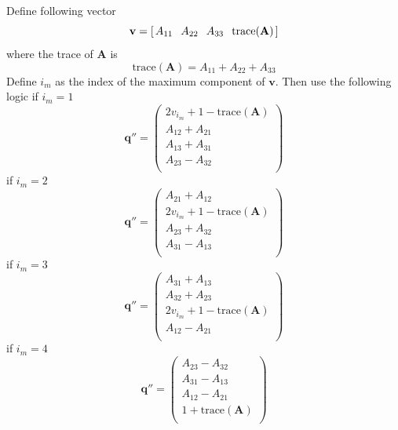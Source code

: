 Define following vector
%
\begin{equation}
   \mathbf{v} = [ \hspace{.02 in} A_{11} \hspace{.1 in} A_{22}\hspace{.1 in}
   A_{33} \hspace{.1 in}  \mbox{trace}(\mathbf{A}) \hspace{.02 in}]
\end{equation}
%
where the trace of $\mathbf{A}$ is
%
\begin{equation}
    \text{trace}(\mathbf{A}) =
    A_{11}+A_{22}+A_{33}
\end{equation}
%
Define $i_m$ as the index of the maximum component of $\mathbf{v}$.  Then use
the following logic
%
\noindent if $i_m = 1$
%
\begin{equation}
     \mathbf{q}''  = \begin{pmatrix}
     2v_{i_m} + 1 - \mbox{trace}(\mathbf{A})\\
     A_{12} + A_{21}\\
     A_{13} + A_{31}\\
     A_{23} - A_{32}\\
     \end{pmatrix}
\end{equation}
%
if $i_m = 2$
%
\begin{equation}
     \mathbf{q}''  = \begin{pmatrix}
     A_{21} + A_{12}\\
     2v_{i_m} + 1 - \mbox{trace}(\mathbf{A})\\
     A_{23} + A_{32}\\
     A_{31} - A_{13}\\
     \end{pmatrix}
\end{equation}
%
if $i_m = 3$
%
\begin{equation}
     \mathbf{q}''  = \begin{pmatrix}
     A_{31} + A_{13}\\
     A_{32} + A_{23}\\
     2v_{i_m} + 1 - \mbox{trace}(\mathbf{A})\\
     A_{12} - A_{21}\\
     \end{pmatrix}
\end{equation}
%
if $i_m = 4$
%
\begin{equation}
     \mathbf{q}''  = \begin{pmatrix}
     A_{23} - A_{32}\\
     A_{31} - A_{13}\\
     A_{12} - A_{21}\\
     1 + \mbox{trace}(\mathbf{A})\\
     \end{pmatrix}
\end{equation}
